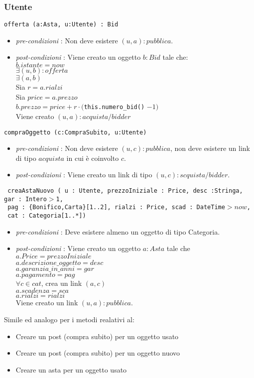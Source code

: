 \documentclass[12pt, letterpaper]{article}
\newcommand{\code}[1]{\colorbox{light-gray}{\texttt{#1}}}
\newcommand{\codee}[1]{\colorbox{white}{\texttt{#1}}}
\begin{document}
\subsubsection{Utente}
\code{offerta (a:Asta, u:Utente) :  Bid }\begin{itemize}
    \item \textit{pre-condizioni} : Non deve esistere $(u,a):pubblica$. 
    \item \textit{post-condizioni} : Viene creato un oggetto $b:Bid$ tale che:\\ 
     $b.istante=now$ \\
     $\exists (u,b) : offerta$ \\
     $\exists (a,b) $ \\ 
     Sia $r=a.rialzi$\\ 
     Sia $price=a.prezzo$\\
     $b.prezzo = price + r\cdot ($\codee{this.numero\_bid()} $-1 )$\\
     Viene creato $(u,a):acquista/bidder$ 
\end{itemize}
\code{compraOggetto (c:CompraSubito, u:Utente) }\begin{itemize}
    \item \textit{pre-condizioni} : Non deve esistere $(u,c):pubblica$, non deve 
    esistere un link di tipo $acquista$ in cui è coinvolto $c$. 
    \item \textit{post-condizioni} : Viene creato un link di tipo $(u,c):scquista/bidder$.
\end{itemize}
\code{ creaAstaNuovo ( u : Utente, prezzoIniziale : Price, desc :Stringa, gar : Intero$>$1,
}\\\code{ pag : \{Bonifico,Carta\}[1..2],
rialzi : Price, scad : DateTime$> now$,}\\\code{ cat : Categoria[1..*])}\begin{itemize}
    \item \textit{pre-condizioni} : Deve esistere almeno un oggetto di tipo Categoria.
    \item \textit{post-condizioni} : Viene creato un oggetto $a:Asta$ tale che\\ 
    $a.Price = prezzoIniziale$\\ 
    $a.descrizione\_oggetto = desc$\\ 
    $a.garanzia\_in\_anni = gar$\\ 
    $a.pagamento = pag$\\
    $\forall c \in cat$, crea un link $(a,c)$\\
    $a.scadenza=sca$ \\
    $a.rialzi=rialzi$\\
    Viene creato un link $(u,a):pubblica$.
\end{itemize}
Simile ed analogo per i metodi realativi al:\begin{itemize}
    \item Creare un post (compra subito) per un oggetto usato 
    \item Creare un post (compra subito) per un oggetto nuovo 
    \item Creare un asta per un oggetto usato
\end{itemize}
\end{document}
